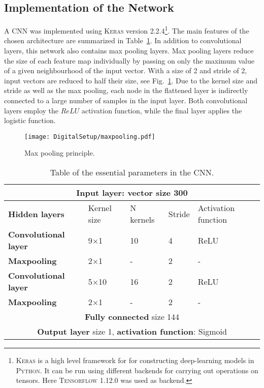 \documentclass[main.tex]{subfiles}
\begin{document}
\subsection{Implementation of the Network}
A CNN was implemented using \textsc{Keras} version 2.2.4\footnote{\textsc{Keras} is a high level framework for for constructing deep-learning models in \textsc{Python}. It can be run using different backends for carrying out operations on tensors. Here \textsc{Tensorflow} 1.12.0 was used as backend.}\cite{keras}. The main features of the chosen architecture are summarized in Table~\ref{tab:architecture}. In addition to convolutional layers, this network also contains max pooling layers. Max pooling layers reduce the size of each feature map individually by passing on only the maximum value of a given neighbourhood of the input vector. With a size of 2 and stride of 2, input vectors are reduced to half their size, see Fig.~\ref{fig:maxpooking}. Due to the kernel size and stride as well as the max pooling, each node in the flattened layer is indirectly connected to a large number of samples in the input layer. Both convolutional layers employ the $ReLU$ activation function, while the final layer applies the logistic function.
\begin{figure}[ht!]
    \centering
        \texttt{[image: DigitalSetup/maxpooling.pdf]}
        \caption[The Max pooling principle]{Max pooling principle.}
    \label{fig:maxpooking} 
\end{figure}

\begin{table}[h]
\center
\begin{tabular}{|l|l|l|l|l|}
\hline
\multicolumn{5}{|c|}{\textbf{Input layer}: vector size 300}                                            \\ \hline
\textbf{Hidden layers}       & Kernel size & N kernels & Stride & Activation function \\ \hline
\textbf{Convolutional layer} & 9$\times$1           & 10                & 4             & ReLU                \\ \hline
\textbf{Maxpooling}          & 2$\times$1           & -                 & 2             & -                   \\ \hline
\textbf{Convolutional layer} & 5$\times$10           & 16                & 2             & ReLU                \\ \hline
\textbf{Maxpooling}          & 2$\times$1           & -                 & 2             & -                   \\ \hline
\multicolumn{5}{|c|}{\textbf{Fully connected} size 144}
\\ \hline
\multicolumn{5}{|c|}{\textbf{Output layer} size 1, \textbf{activation function}: Sigmoid}               \\ \hline
\end{tabular}
\caption{Table of the essential parameters in the CNN.}
\label{tab:architecture}
\end{table}
\end{document}
